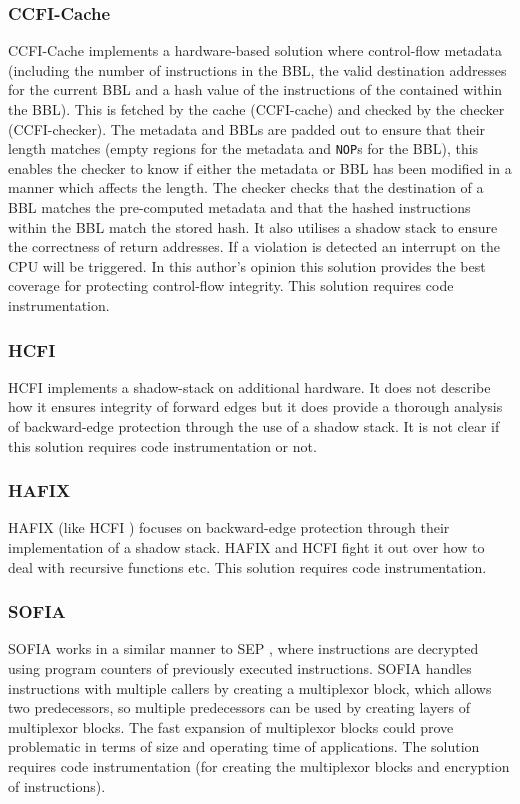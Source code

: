 \subsubsection{CCFI-Cache}
CCFI-Cache \cite{Danger2018} implements a hardware-based solution where control-flow metadata (including the number of instructions in the BBL, the valid destination addresses for the current BBL and a hash value of the instructions of the contained within the BBL). This is fetched by the cache (CCFI-cache) and checked by the checker (CCFI-checker). The metadata and BBLs are padded out to ensure that their length matches (empty regions for the metadata and \verb|NOP|s for the BBL), this enables the checker to know if either the metadata or BBL has been modified in a manner which affects the length. The checker checks that the destination of a BBL matches the pre-computed metadata and that the hashed instructions within the BBL match the stored hash. It also utilises a shadow stack to ensure the correctness of return addresses. If a violation is detected an interrupt on the CPU will be triggered. In this author's opinion this solution provides the best coverage for protecting control-flow integrity. This solution requires code instrumentation.

\subsubsection{HCFI}
HCFI \cite{Danger2018} implements a shadow-stack on additional hardware. It does not describe how it ensures integrity of forward edges but it does provide a thorough analysis of backward-edge protection through the use of a shadow stack. It is not clear if this solution requires code instrumentation or not.

\subsubsection{HAFIX}
HAFIX \cite{Davi2015} (like HCFI \cite{Danger2018}) focuses on backward-edge protection through their implementation of a shadow stack. HAFIX and HCFI fight it out over how to deal with recursive functions etc. This solution requires code instrumentation.

\subsubsection{SOFIA}
SOFIA \cite{Davi2015} works in a similar manner to SEP \cite{Lee2019}, where instructions are decrypted using program counters of previously executed instructions. SOFIA handles instructions with multiple callers by creating a multiplexor block, which allows two predecessors, so multiple predecessors can  be used by creating layers of multiplexor blocks. The fast expansion of multiplexor blocks could prove problematic in terms of size and operating time of applications. The solution requires code instrumentation (for creating the multiplexor blocks and encryption of instructions).

